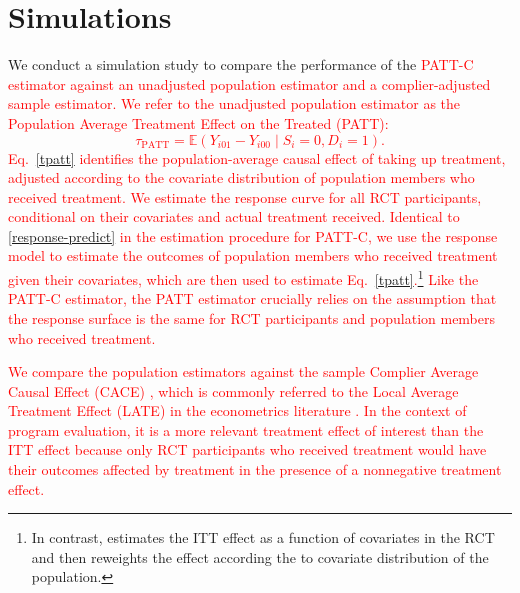 \documentclass[hidelinks,12pt]{article}
\newcommand{\ex}{\mathbb{E}} %
\begin{document}
\section{Simulations} \label{sim}

We conduct a simulation study to compare the performance of the \textcolor{red}{PATT-C estimator against an unadjusted population estimator and a complier-adjusted sample estimator. We refer to the unadjusted population estimator as the Population Average Treatment Effect on the Treated (PATT):
%	
\begin{equation}\label{tpatt}
\tau_{\text{PATT}} = \ex\left( Y_{i01} - Y_{i00} \mid S_i=0, D_i=1\right).
\end{equation}
%
Eq.~\eqref{tpatt} identifies the population-average causal effect of taking up treatment, adjusted according to the covariate distribution of population members who received treatment. We estimate the response curve for all RCT participants, conditional on their covariates and actual treatment received. Identical to \ref{response-predict} in the estimation procedure for PATT-C, we use the response model to estimate the outcomes of population members who received treatment given their covariates, which are then used to estimate Eq.~\eqref{tpatt}.\footnote{In contrast, \citet{Hartman} estimates the ITT effect as a function of covariates in the RCT and then reweights the effect according the to covariate distribution of the population.} Like the PATT-C estimator, the PATT estimator crucially relies on the assumption that the response surface is the same for RCT participants and population members who received treatment.}

\textcolor{red}{
We compare the population estimators against the sample Complier Average Causal Effect (CACE) \citep{imbens1997bayesian}, which is commonly referred to the Local Average Treatment Effect (LATE) in the econometrics literature \citep{imbens1994identification,Angrist1996}. In the context of program evaluation, it is a more relevant treatment effect of interest than the ITT effect because only RCT participants who received treatment would have their outcomes affected by treatment in the presence of a nonnegative treatment effect.} 
\end{document}
